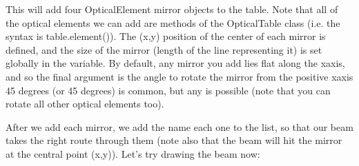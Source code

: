 \documentclass[letterpaper,10pt,english]{sphinxmanual}
\begin{document}
\begin{sphinxVerbatim}[commandchars=\\\{\}]
  
  

  

  

  
\end{sphinxVerbatim}

\sphinxAtStartPar
This will add four OpticalElement mirror objects to the table. Note that all of the optical elements we can add are methods of the OpticalTable class (i.e. the syntax is table.element()). The (x,y) position of the center of each mirror is defined, and the size of the mirror (length of the line representing it) is set globally in the  variable. By default, any mirror you add lies flat along the x\sphinxhyphen{}axis, and so the final argument is the angle to rotate the mirror from the positive x\sphinxhyphen{}axis \sphinxhyphen{} 45 degrees (or \sphinxhyphen{}45 degrees) is common, but any is possible (note that you can rotate all other optical elements too).

\sphinxAtStartPar
After we add each mirror, we add the name each one to the  list, so that our beam takes the right route through them (note also that the beam will hit the mirror at the central point (x,y)). Let’s try drawing the beam now:

\begin{sphinxVerbatim}[commandchars=\\\{\}]
 
\end{sphinxVerbatim}
\end{document}
